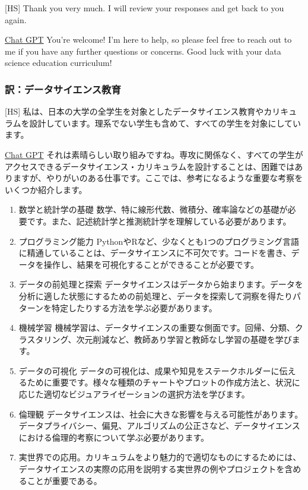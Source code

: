 \documentclass[
]{bxjsbook}
\theoremstyle{definition}
\theoremstyle{definition}
\theoremstyle{definition}
\theoremstyle{definition}
\theoremstyle{remark}
\begin{document}
{[}HS{]} Thank you very much. I will review your responses and get back to you again.

\protect\hyperlink{chatgpt}{Chat GPT} You're welcome! I'm here to help, so please feel free to reach out to me if you have any further questions or concerns. Good luck with your data science education curriculum!

\hypertarget{dseducationj}{%
\subsubsection{訳：データサイエンス教育}\label{dseducationj}}

{[}HS{]} 私は、日本の大学の全学生を対象としたデータサイエンス教育やカリキュラムを設計しています。理系でない学生も含めて、すべての学生を対象にしています。

\protect\hyperlink{chatgpt}{Chat GPT} それは素晴らしい取り組みですね。専攻に関係なく、すべての学生がアクセスできるデータサイエンス・カリキュラムを設計することは、困難ではありますが、やりがいのある仕事です。ここでは、参考になるような重要な考察をいくつか紹介します。

\begin{enumerate}
\def\labelenumi{\arabic{enumi}.}
\item
  数学と統計学の基礎 数学、特に線形代数、微積分、確率論などの基礎が必要です。また、記述統計学と推測統計学を理解している必要があります。
\item
  プログラミング能力 PythonやRなど、少なくとも1つのプログラミング言語に精通していることは、データサイエンスに不可欠です。コードを書き、データを操作し、結果を可視化することができることが必要です。
\item
  データの前処理と探索 データサイエンスはデータから始まります。データを分析に適した状態にするための前処理と、データを探索して洞察を得たりパターンを特定したりする方法を学ぶ必要があります。
\item
  機械学習 機械学習は、データサイエンスの重要な側面です。回帰、分類、クラスタリング、次元削減など、教師あり学習と教師なし学習の基礎を学びます。
\item
  データの可視化 データの可視化は、成果や知見をステークホルダーに伝えるために重要です。様々な種類のチャートやプロットの作成方法と、状況に応じた適切なビジュアライゼーションの選択方法を学びます。
\item
  倫理観 データサイエンスは、社会に大きな影響を与える可能性があります。データプライバシー、偏見、アルゴリズムの公正さなど、データサイエンスにおける倫理的考察について学ぶ必要があります。
\item
  実世界での応用。カリキュラムをより魅力的で適切なものにするためには、データサイエンスの実際の応用を説明する実世界の例やプロジェクトを含めることが重要である。
\end{enumerate}
\end{document}
